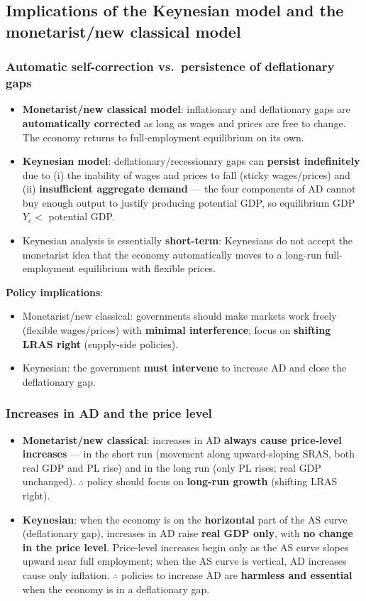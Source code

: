 \subsection{Implications of the Keynesian model and the monetarist/new classical model}
\subsubsection*{Automatic self-correction vs.\ persistence of deflationary gaps}
\begin{itemize}
  \item \textbf{Monetarist/new classical model}: inflationary and deflationary gaps are \textbf{automatically corrected} as long as wages and prices are free to change. The economy returns to full-employment equilibrium on its own.
  \item \textbf{Keynesian model}: deflationary/recessionary gaps can \textbf{persist indefinitely} due to (i) the inability of wages and prices to fall (sticky wages/prices) and (ii) \textbf{insufficient aggregate demand} --- the four components of AD cannot buy enough output to justify producing potential GDP, so equilibrium GDP $Y_e <$ potential GDP.
  \item Keynesian analysis is essentially \textbf{short-term}: Keynesians do not accept the monetarist idea that the economy automatically moves to a long-run full-employment equilibrium with flexible prices.
\end{itemize}
\textbf{Policy implications}:
\begin{itemize}
  \item Monetarist/new classical: governments should make markets work freely (flexible wages/prices) with \textbf{minimal interference}; focus on \textbf{shifting LRAS right} (supply-side policies).
  \item Keynesian: the government \textbf{must intervene} to increase AD and close the deflationary gap.
\end{itemize}
\subsubsection*{Increases in AD and the price level}
\begin{itemize}
  \item \textbf{Monetarist/new classical}: increases in AD \textbf{always cause price-level increases} --- in the short run (movement along upward-sloping SRAS, both real GDP and PL rise) and in the long run (only PL rises; real GDP unchanged). $\therefore$ policy should focus on \textbf{long-run growth} (shifting LRAS right).
  \item \textbf{Keynesian}: when the economy is on the \textbf{horizontal} part of the AS curve (deflationary gap), increases in AD raise \textbf{real GDP only}, with \textbf{no change in the price level}. Price-level increases begin only as the AS curve slopes upward near full employment; when the AS curve is vertical, AD increases cause only inflation. $\therefore$ policies to increase AD are \textbf{harmless and essential} when the economy is in a deflationary gap.
\end{itemize}
